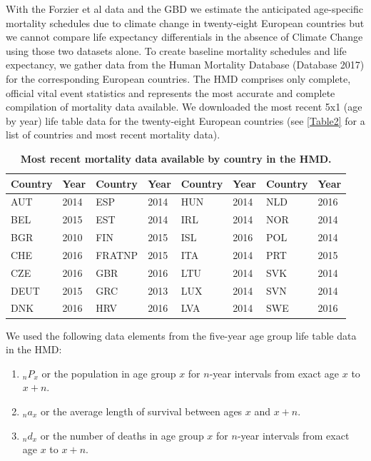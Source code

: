 \documentclass[12pt,]{article}
\begin{document}
With the Forzier et al data and the GBD we estimate the anticipated
age-specific mortality schedules due to climate change in twenty-eight
European countries but we cannot compare life expectancy differentials
in the absence of Climate Change using those two datasets alone. To
create baseline mortality schedules and life expectancy, we gather data
from the Human Mortality Database (Database 2017) for the corresponding
European countries. The HMD comprises only complete, official vital
event statistics and represents the most accurate and complete
compilation of mortality data available. We downloaded the most recent
5x1 (age by year) life table data for the twenty-eight European
countries (see \autoref{Table2} for a list of countries and most recent
mortality data).

\begin{table}
\caption{\textbf{Most recent mortality data available by country in the HMD.}} \label{Table2}
\begin{tabular}{ll|ll|ll|ll}
Country & Year & Country & Year & Country & Year & Country & Year \\
\hline
AUT     & 2014 & ESP     & 2014 & HUN     & 2014 & NLD     & 2016 \\
BEL     & 2015 & EST     & 2014 & IRL     & 2014 & NOR     & 2014 \\
BGR     & 2010 & FIN     & 2015 & ISL     & 2016 & POL     & 2014 \\
CHE     & 2016 & FRATNP  & 2015 & ITA     & 2014 & PRT     & 2015 \\
CZE     & 2016 & GBR     & 2016 & LTU     & 2014 & SVK     & 2014 \\
DEUT    & 2015 & GRC     & 2013 & LUX     & 2014 & SVN     & 2014 \\
DNK     & 2016 & HRV     & 2016 & LVA     & 2014 & SWE     & 2016 \\
\hline
\end{tabular}
\end{table}

We used the following data elements from the five-year age group life
table data in the HMD:

\begin{enumerate}
\item $_nP_x$ or the population in age group $x$ for $n$-year intervals from exact age $x$ to $x+n$.
\item $_na_x$ or the average length of survival between ages $x$ and $x+n$.
\item $_nd_x$ or the number of deaths in age group $x$ for $n$-year intervals from exact age $x$ to $x+n$.
\end{enumerate}
\end{document}
